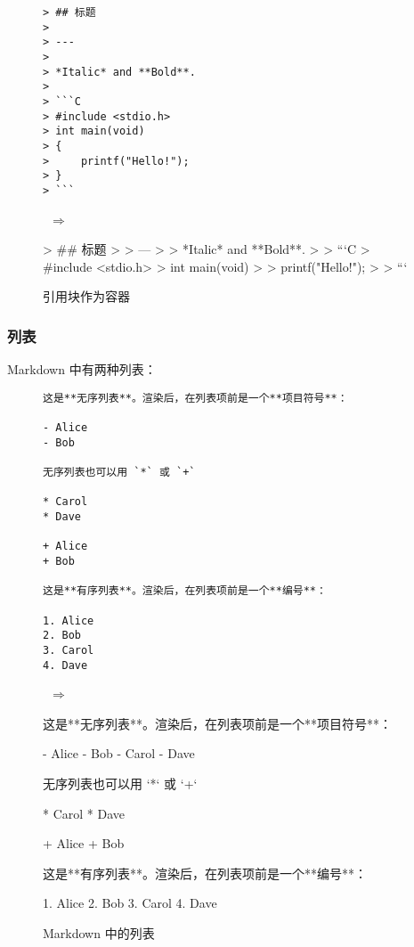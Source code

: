 \documentclass[a4paper,fontset=none]{ctexart}
\begin{document}
\begin{figure}[H]
    \centering
    \begin{minipage}{0.45\textwidth}
        \begin{verbatim}
> ## 标题
>
> ---
>
> *Italic* and **Bold**.
>
> ```C
> #include <stdio.h>
> int main(void)
> {
>     printf("Hello!");
> }
> ```
        \end{verbatim}
    \end{minipage}
    \, $\Longrightarrow$ \,
    \begin{minipage}{0.45\textwidth}
\begin{markdown}
> ## 标题
>
> ---
>
> *Italic* and **Bold**.
>
> ```C
> #include <stdio.h>
> int main(void)
> {
>     printf("Hello!");
> }
> ```
\end{markdown}
    \end{minipage}
    \caption{引用块作为容器}
\end{figure}

\subsubsection{列表}

Markdown 中有两种列表：

\begin{figure}[H]
    \centering
    \begin{minipage}{0.45\textwidth}
        \begin{verbatim}
这是**无序列表**。渲染后，在列表项前是一个**项目符号**：

- Alice
- Bob

无序列表也可以用 `*` 或 `+`

* Carol
* Dave

+ Alice
+ Bob

这是**有序列表**。渲染后，在列表项前是一个**编号**：

1. Alice
2. Bob
3. Carol
4. Dave
        \end{verbatim}
    \end{minipage}
    \, $\Longrightarrow$ \,
    \begin{minipage}{0.45\textwidth}
\begin{markdown}
这是**无序列表**。渲染后，在列表项前是一个**项目符号**：

- Alice
- Bob
- Carol
- Dave

无序列表也可以用 `*` 或 `+`

* Carol
* Dave

+ Alice
+ Bob

这是**有序列表**。渲染后，在列表项前是一个**编号**：

1. Alice
2. Bob
3. Carol
4. Dave
\end{markdown}
    \end{minipage}
    \caption{Markdown 中的列表}
\end{figure}
\end{document}
